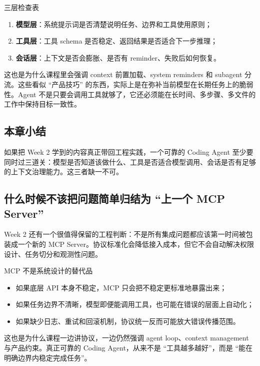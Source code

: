 \documentclass[a4paper]{article}
\begin{document}
\begin{knowledgebox}{三层检查表}
\begin{enumerate}
    \item \textbf{模型层}：系统提示词是否清楚说明任务、边界和工具使用原则；
    \item \textbf{工具层}：工具 schema 是否稳定、返回结果是否适合下一步推理；
    \item \textbf{会话层}：上下文是否会膨胀、是否有 reminder、失败后如何恢复。
\end{enumerate}
\end{knowledgebox}

这也是为什么课程里会强调 context 前置加载、system reminders 和 subagent 分流。这些看似 ``产品技巧'' 的东西，实际上是在弥补当前模型在长期任务上的脆弱性。Agent 不是只要会调用工具就够了，它还必须能在长时间、多步骤、多文件的工作中保持目标一致性。

\subsection{本章小结}
如果把 Week 2 学到的内容真正带回工程实践，一个可靠的 Coding Agent 至少要同时过三道关：模型是否知道该做什么、工具是否适合模型调用、会话是否有足够的上下文治理能力。这三者缺一不可。

\subsection{什么时候不该把问题简单归结为 ``上一个 MCP Server''}
Week 2 还有一个很值得保留的工程判断：不是所有集成问题都应该第一时间被包装成一个新的 MCP Server。协议标准化会降低接入成本，但它不会自动解决权限设计、任务切分和观测性问题。

\begin{warningbox}{MCP 不是系统设计的替代品}
\begin{itemize}
    \item 如果底层 API 本身不稳定，MCP 只会把不稳定更标准地暴露出来；
    \item 如果任务边界不清晰，模型即便能调用工具，也可能在错误的层面上自动化；
    \item 如果缺少日志、重试和回滚机制，协议统一反而可能放大错误传播范围。
\end{itemize}
\end{warningbox}

这也是为什么课程一边讲协议，一边仍然强调 agent loop、context management 与产品约束。真正可靠的 Coding Agent，从来不是 ``工具越多越好''，而是 ``能在明确边界内稳定完成任务''。
\end{document}
